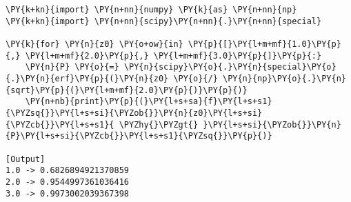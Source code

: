 \begin{Verbatim}[label=\makebox{\href{https://bitbucket.org/lbaldini/statnotes/src/master/snippets/scipy.special.erf.py}{https://bitbucket.org/.../scipy.special.erf.py}},commandchars=\\\{\}]
\PY{k+kn}{import} \PY{n+nn}{numpy} \PY{k}{as} \PY{n+nn}{np}
\PY{k+kn}{import} \PY{n+nn}{scipy}\PY{n+nn}{.}\PY{n+nn}{special}

\PY{k}{for} \PY{n}{z0} \PY{o+ow}{in} \PY{p}{[}\PY{l+m+mf}{1.0}\PY{p}{,} \PY{l+m+mf}{2.0}\PY{p}{,} \PY{l+m+mf}{3.0}\PY{p}{]}\PY{p}{:}
    \PY{n}{P} \PY{o}{=} \PY{n}{scipy}\PY{o}{.}\PY{n}{special}\PY{o}{.}\PY{n}{erf}\PY{p}{(}\PY{n}{z0} \PY{o}{/} \PY{n}{np}\PY{o}{.}\PY{n}{sqrt}\PY{p}{(}\PY{l+m+mf}{2.0}\PY{p}{)}\PY{p}{)}
    \PY{n+nb}{print}\PY{p}{(}\PY{l+s+sa}{f}\PY{l+s+s1}{\PYZsq{}}\PY{l+s+si}{\PYZob{}}\PY{n}{z0}\PY{l+s+si}{\PYZcb{}}\PY{l+s+s1}{ \PYZhy{}\PYZgt{} }\PY{l+s+si}{\PYZob{}}\PY{n}{P}\PY{l+s+si}{\PYZcb{}}\PY{l+s+s1}{\PYZsq{}}\PY{p}{)}

[Output]
1.0 -> 0.6826894921370859
2.0 -> 0.9544997361036416
3.0 -> 0.9973002039367398
\end{Verbatim}